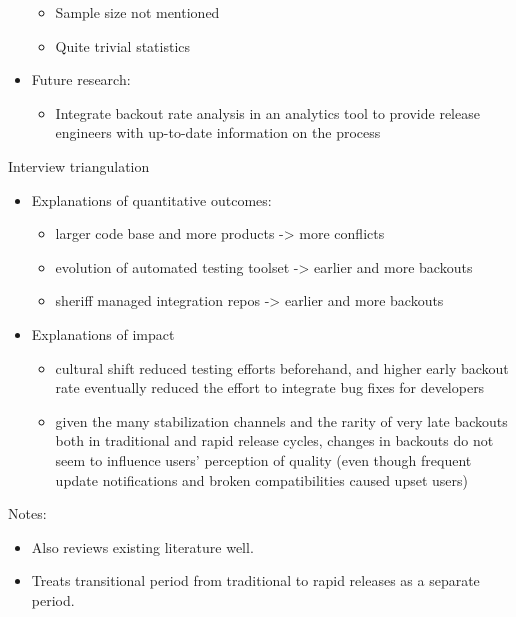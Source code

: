 \documentclass[]{book}
\providecommand{\tightlist}{%
  \setlength{\itemsep}{0pt}\setlength{\parskip}{0pt}}
\begin{document}
\begin{itemize}
  \begin{itemize}
  \tightlist
  \item
    Sample size not mentioned
  \item
    Quite trivial statistics
  \end{itemize}
\item
  Future research:

  \begin{itemize}
  \tightlist
  \item
    Integrate backout rate analysis in an analytics tool to provide
    release engineers with up-to-date information on the process
  \end{itemize}
\end{itemize}

Interview triangulation

\begin{itemize}
\tightlist
\item
  Explanations of quantitative outcomes:

  \begin{itemize}
  \tightlist
  \item
    larger code base and more products -\textgreater{} more conflicts
  \item
    evolution of automated testing toolset -\textgreater{} earlier and
    more backouts
  \item
    sheriff managed integration repos -\textgreater{} earlier and more
    backouts
  \end{itemize}
\item
  Explanations of impact

  \begin{itemize}
  \tightlist
  \item
    cultural shift reduced testing efforts beforehand, and higher early
    backout rate eventually reduced the effort to integrate bug fixes
    for developers
  \item
    given the many stabilization channels and the rarity of very late
    backouts both in traditional and rapid release cycles, changes in
    backouts do not seem to influence users' perception of quality (even
    though frequent update notifications and broken compatibilities
    caused upset users)
  \end{itemize}
\end{itemize}

Notes:

\begin{itemize}
\tightlist
\item
  Also reviews existing literature well.
\item
  Treats transitional period from traditional to rapid releases as a
  separate period.
\end{itemize}
\end{document}
